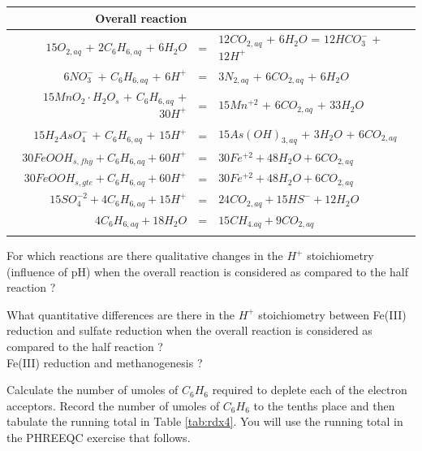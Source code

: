 \begin{table}[h]
\centering
\footnotesize
\begin{tabular}{rll}
\toprule 
Overall reaction &  &\\
\midrule
$15O_{2,aq}$ + $2C_6H_{6,aq}$ + $6H_2O$    & = & $12CO_{2,aq}$ + $6H_2O$  = $12HCO_3^-$ + $12H^+$  \\
$6NO_3^-$ + $C_6H_{6,aq}$ + $6H^+$         & = & $3N_{2,aq}$ + $6CO_{2,aq}$ + $6H_2O$ \\
$15MnO_2·H_2O_s$ + $C_6H_{6,aq}$ + $30H^+$ & = & $15Mn^{+2}$ + $6CO_{2,aq}$ + $33H_2O$ \\
$15H_2AsO_4^-$ + $C_6H_{6,aq}$  + $15H^+$  & = & $15As(OH)_{3,aq}$ +  $3H_2O$ + $6CO_{2,aq}$ \\
$30FeOOH_{s,fhy} + C_6H_{6,aq} + 60H^+$    & = & $30Fe^{+2} + 48H_2O + 6CO_{2,aq}$ \\
$30FeOOH_{s,gte} + C_6H_{6,aq} + 60H^+$    & = & $30Fe^{+2} + 48H_2O + 6CO_{2,aq}$ \\
$15SO_4^{-2} + 4C_6H_{6,aq} + 15H^+$       & = & $24CO_{2,aq} + 15HS^- + 12H_2O$ \\
$4C_6H_{6,aq} + 18H_2O$                    & = & $15CH_{4.aq} + 9CO_{2,aq}$ \\
\bottomrule
\label{tab:rdx3}
\end{tabular}
\end{table}	

For which reactions are there qualitative changes in the $H^+$
stoichiometry (influence of pH) when the overall reaction 
is considered as compared to the half reaction ?

What quantitative differences are there in the
$H^+$ stoichiometry between Fe(III) reduction and sulfate 
reduction when the overall reaction is considered as compared to 
the half reaction ?  \\
Fe(III) reduction and methanogenesis ?

Calculate the number of umoles of $C_6H_6$ required to deplete 
each of the electron acceptors.  
Record the number of umoles of $C_6H_6$ to the tenths place and 
then tabulate the running total in Table \ref{tab:rdx4}.  
You will use the running total in the PHREEQC exercise that follows.

